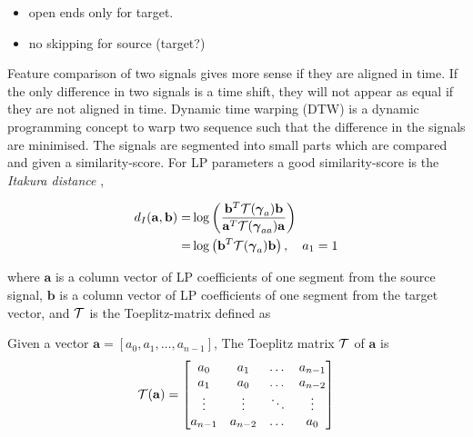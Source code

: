 \begin{itemize}
	\item open ends only for target.
	\item no skipping for source (target?)
\end{itemize}

Feature comparison of two signals gives more sense if they are aligned in time. If the only difference in two signals is a time shift, they will not appear as equal if they are not aligned in time. Dynamic time warping (DTW) is a dynamic programming concept to warp two sequence such that the difference in the signals are minimised. The signals are segmented into small parts which are compared and given a similarity-score. For LP parameters a good similarity-score is the \emph{Itakura distance} \cite{itakura90},
\newcommand{\ita}{d_{I}}
\begin{definition}
	\begin{equation}
		\label{eq:itakura_distance}
		\begin{split}
			\ita(\mathbf{a},\mathbf{b}) = & \log\pbrackets{\frac{\mathbf{b}^T \ttt(\auto_{a}) \mathbf{b}}{\mathbf{a}^T \ttt(\auto_{aa}) \mathbf{a}}} \\
			 = & \log\pbrackets{\mathbf{b}^T \ttt(\auto_{a}) \mathbf{b}}, \quad a_1 = 1
		\end{split}
	\end{equation}
\end{definition}
where $\mathbf{a}$ is a column vector of LP coefficients of one segment from the source signal, $\mathbf{b}$ is a column vector of LP coefficients of one segment from the target vector, and $\mathcal T$ is the Toeplitz-matrix defined as
\begin{definition}
	Given a vector $\mathbf{a} = [a_0, a_1,\dotsc, a_{n-1}]$, The Toeplitz matrix $\mathcal T$ of $\mathbf{a}$ is 
	\begin{equation}
		\label{eq:toeplitz}
		\mathcal T(\mathbf{a}) = 
		\begin{bmatrix}
		a_0 & a_1 & \dots & a_{n-1} 	\\
		a_1 & a_0 & \dots & a_{n-2} \\
		\vdots & \vdots & \ddots & \vdots \\
		a_{n-1} & a_{n-2} & \dots & a_{0}
		\end{bmatrix}
	\end{equation}	
\end{definition}

